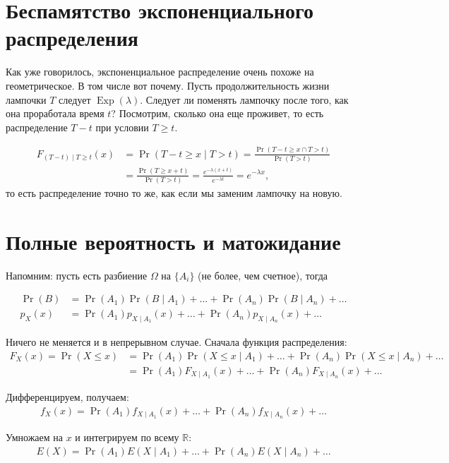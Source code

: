 \documentclass[12pt]{article}
\newcommand\R{\mathbb{R}}
\DeclareMathOperator{\Exp}{Exp}
\begin{document}
\section{Беспамятство экспоненциального распределения}

Как уже говорилось, экспоненциальное распределение очень похоже на геометрическое. В том числе вот почему. Пусть продолжительность жизни лампочки $T$ следует $\Exp(\lambda)$. Следует ли поменять лампочку после того, как она проработала время $t$? Посмотрим, сколько она еще проживет, то есть распределение $T - t$ при условии $T \ge t$. 

\begin{align*}
  F_{(T - t) \mid T \ge t}(x) &= \Pr(T - t \ge x \mid T > t) = \frac{\Pr(T - t \ge x \cap T > t)}{\Pr(T > t)} \\
  &= \frac{\Pr(T\ge x + t)}{\Pr(T > t)} = \frac{e^{-\lambda(x + t)}}{e^{-\lambda t}} = e^{-\lambda x},  
\end{align*}
то есть распределение точно то же, как если мы заменим лампочку на новую.

\section{Полные вероятность и матожидание}

Напомним: пусть есть разбиение $\Omega$ на $\{A_i\}$ (не более, чем счетное), тогда

\begin{align*}
  \Pr(B) &= \Pr(A_1) \Pr(B \mid A_1) + \dots +  \Pr(A_n) \Pr(B \mid A_n) + \dots \\
  p_X(x) &= \Pr(A_1) p_{X \mid A_1}(x) + \dots + \Pr(A_n) p_{X \mid A_n}(x) + \dots
\end{align*}

Ничего не меняется и в непрерывном случае. Сначала функция распределения:
\begin{align*}
  F_X(x) = \Pr(X \le x) &= \Pr(A_1) \Pr(X \le x \mid A_1) + \dots + \Pr(A_n) \Pr(X \le x \mid A_n) + \dots \\
  &= \Pr(A_1) F_{X \mid A_1}(x) + \dots + \Pr(A_n) F_{X \mid A_n}(x) + \dots
\end{align*}

Дифференцируем, получаем:
\begin{align*}
  f_X(x) = \Pr(A_1) f_{X \mid A_1}(x) + \dots + \Pr(A_n) f_{X \mid A_n}(x) + \dots
\end{align*}

Умножаем на $x$ и интегрируем по всему $\R$:
\begin{align*}
  E(X) = \Pr(A_1) E(X \mid A_1) + \dots + \Pr(A_n) E(X \mid A_n) + \dots
\end{align*}
\end{document}
